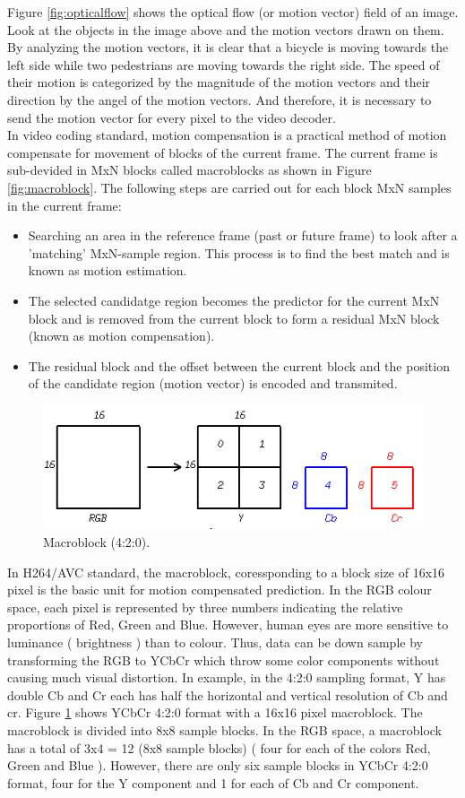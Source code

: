 Figure \ref{fig:opticalflow} shows the optical flow (or motion vector) field of an image. Look at the objects in the image above and the motion vectors drawn on them. By analyzing the motion vectors, it is clear that a bicycle is moving towards the left side while two pedestrians are moving towards the right side. The speed of their motion is categorized by the magnitude of the motion vectors and their direction by the angel of the motion vectors. And therefore, it is necessary to send the motion vector for every pixel to the video decoder.\\
 In video coding standard, motion compensation is a practical method of motion compensate for movement of blocks of the current frame. The current frame is sub-devided in MxN blocks called macroblocks as shown in Figure \ref{fig:macroblock}. The following steps are carried out for each block MxN samples in the current frame:
\begin{itemize}
\item Searching an area in the reference frame (past or future frame) to look after a 'matching' MxN-sample region. This process is to find the best match and is known as motion estimation.
\item The selected candidatge region becomes the predictor for the current MxN block and is removed from the current block to form a residual MxN block (known as motion compensation).
\item The residual block and the offset between the current block and the position of the candidate region (motion vector) is encoded and transmited. 
\end{itemize}
\begin{figure}
\centering
 \includegraphics[width=0.8\linewidth]{Figures/yuv420.png}
 \caption{Macroblock (4:2:0).}
 \label{fig:yuv420}
\end{figure}
	In H264/AVC standard, the macroblock, coressponding to a block size of 16x16 pixel is the basic unit for motion compensated prediction. In the RGB colour space, each pixel is represented by three numbers indicating the relative proportions of Red, Green and Blue. However, human eyes are more sensitive to luminance ( brightness ) than to colour. Thus, data can be down sample by transforming the RGB to YCbCr which throw some color components without causing much visual distortion. In example, in the 4:2:0 sampling format, Y has double Cb and Cr each has half the horizontal and vertical resolution of Cb and cr. Figure \ref{fig:yuv420} shows YCbCr 4:2:0 format with a 16x16 pixel macroblock. The macroblock is divided into 8x8 sample blocks. In the RGB space, a macroblock has a total of 3x4 = 12 (8x8 sample blocks) ( four for each of the colors Red, Green and Blue ). However, there are only six sample blocks in YCbCr 4:2:0 format, four for the Y component and 1 for each of Cb and Cr component.\\
